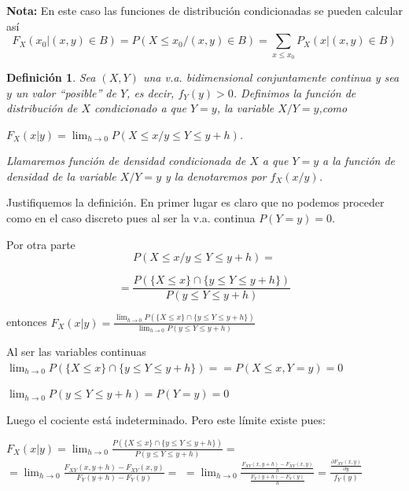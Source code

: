 \documentclass[12pt]{report}
\newtheorem{definition}{Definici\'on}
\begin{document}
\textbf{Nota:} En este caso las funciones de distribución condicionadas se pueden calcular así
$$F_{X}(x_{0}|(x,y)\in B)=P(X\leq x_{0}/(x,y)\in B)=\sum_{x\leq
x_{0}}P_{X}(x|(x,y)\in B)$$




%
%
%

            

\begin{definition}
    Sea $(X,Y)$ una v.a. bidimensional conjuntamente
    continua y sea $y$ un valor ``posible'' de $Y$, es decir,
    $f_{Y}(y)>0$. Definimos la función de distribución de $X$
    condicionado a que $Y=y$, la variable $X/Y=y$,como

    $F_{X}(x|y)=\lim_{h\to 0} P(X\leq x/y\leq Y\leq y+h)$.

    Llamaremos función de densidad condicionada de $X$ a que $Y=y$ a la función de densidad
    de la variable $X/Y=y$ y la denotaremos por $f_{X}(x/y)$.
\end{definition}

    Justifiquemos la definición. En primer lugar es claro que no
    podemos proceder como en el caso discreto pues al ser la v.a.
    continua $P(Y=y)=0$.

    Por otra parte
    $$\displaystyle{P(X\leq x/y\leq Y\leq y+h)=}$$

   $$\displaystyle{=\frac{P(\{X\leq x\}\cap \{y\leq
    Y\leq y+h\})}{P(y\leq Y\leq y+h)}}$$

    entonces
       $ F_{X}(x|y)=\frac{\lim_{h\to 0}P(\{X\leq x\}\cap \{y\leq
    Y\leq y+h\})}{\lim_{h\to 0}P(y\leq Y\leq y+h)}$

    Al ser las variables continuas
    $\displaystyle{\lim_{h\to 0}P(\{X\leq x\}\cap \{y\leq
    Y\leq y+h\})=}=P(X\leq x,Y= y)=0$

    $\displaystyle{\lim_{h\to 0}P(y\leq Y\leq y+h)=P(Y=y)=0}$

    Luego el cociente está indeterminado. Pero este límite
    existe  pues:

    $F_{X}(x|y)=\lim_{h\to 0}\frac{P(\{X\leq x\}\cap \{y\leq
    Y\leq y+h\})}{P(y\leq Y\leq y+h)}=$\newline
$=\lim_{h\to 0}\frac{F_{XY}(x,y+h)-F_{XY}(x,y)}
    {F_{Y}(y+h)-F_{Y}(y)}=$\newline
    $=\lim_{h\to 0}\frac{\frac{F_{XY}(x,y+h)-F_{XY}(x,y)}{h}}
    {\frac{F_{Y}(y+h)-F_{Y}(y)}{h}}=\frac{\frac{\partial F_{XY}(x,y)}{\partial
    y}}{f_{Y}(y)}$
\end{document}
